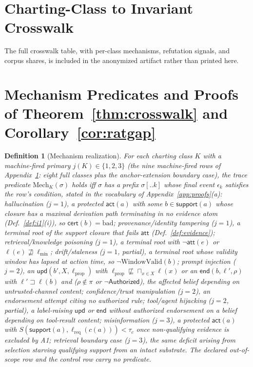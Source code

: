 \documentclass[conference,compsoc]{IEEEtran}
\newtheorem{definition}{Definition}
\theoremstyle{definition}
\theoremstyle{plain}
\providecommand{\tc}{\tau_{c}}
\providecommand{\meet}{\sqcap}
\newcommand{\att}{\ensuremath{\mathsf{att}}}
\newcommand{\cert}{\ensuremath{\mathsf{cert}}}
\newcommand{\support}{\ensuremath{\mathsf{support}}}
\newcommand{\ev}[1]{\ensuremath{\mathsf{#1}}}
\newcommand{\lmin}{\ensuremath{\ell_{\min}}}
\newcommand{\lreq}{\ensuremath{\ell_{\mathrm{req}}}}
\begin{document}
\section{Charting-Class to Invariant Crosswalk}
\label{app:crosswalk}
The full crosswalk table, with per-class mechanisms, refutation signals, and corpus shares, is included in the anonymized artifact rather than printed here.

\section{Mechanism Predicates and Proofs of Theorem~\ref{thm:crosswalk} and Corollary~\ref{cor:ratgap}}
\label{app:t1c2}
\begin{definition}[Mechanism realization]
\label{def:mech}
For each charting class $K$ with a machine-fired primary $j(K) \in
\{1, 2, 3\}$ (the nine machine-fired rows of Appendix~\ref{app:crosswalk}:
eight full classes plus the anchor-extension boundary case), the trace
predicate $\mathrm{Mech}_K(\sigma)$ holds iff $\sigma$ has a prefix
$\sigma[..k]$ whose final event $\epsilon_k$ satisfies the row's
condition, stated in the vocabulary of Appendix~\ref{app:proofs}(a):
\emph{hallucination} ($j{=}1$), a protected $\ev{act}(a)$ with some
$b \in \support(a)$ whose closure has a maximal derivation path
terminating in no evidence atom (Def.~\ref{def:i1}(i)), so
$\cert(b) = \mathrm{bad}$; \emph{provenance/identity tampering}
($j{=}1$), a terminal root of the support closure that fails $\att$
(Def.~\ref{def:evidence}); \emph{retrieval/knowledge poisoning}
($j{=}1$), a terminal root with $\neg\att(e)$ or $\ell(e)
\not\sqsupseteq \lmin$; \emph{drift/staleness} ($j{=}1$, partial), a
terminal root whose validity window has lapsed at action time, so
$\neg\mathrm{WindowValid}(b)$; \emph{prompt injection} ($j{=}2$), an
$\ev{upd}(b', X, \ell_{\mathrm{prop}})$ with $\ell_{\mathrm{prop}}
\not\sqsubseteq \meet_{x \in X} \ell(x)$ or an $\ev{end}(b, \ell',
\rho)$ with $\ell' \sqsupset \ell(b)$ and ($\rho \notin \pi$ or
$\neg\mathsf{Authorized}$), the affected belief depending on
untrusted-channel content; \emph{confidence/trust manipulation}
($j{=}2$), an endorsement attempt citing no authorized rule;
\emph{tool/agent hijacking} ($j{=}2$, partial), a label-raising
$\ev{upd}$ or $\ev{end}$ without authorized endorsement on a belief
depending on tool-result content; \emph{misinformation} ($j{=}3$), a
protected $\ev{act}(a)$ with $S(\support(a), \lreq(c(a))) < \tc$ once
non-qualifying evidence is excluded by A1; \emph{retrieval boundary
case} ($j{=}3$), the same deficit arising from selection starving
qualifying support from an intact substrate. The declared out-of-scope
row and the control row carry no predicate.
\end{definition}
\end{document}
